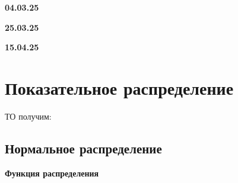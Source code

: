 \documentclass{article}
\begin{document}
\textbf{04.03.25}


\textbf{25.03.25}




\textbf{15.04.25}


\section{Показательное распределение}



















ТО получим:






\subsection{Нормальное распределение}




\textbf{Функция распределения}
\end{document}
